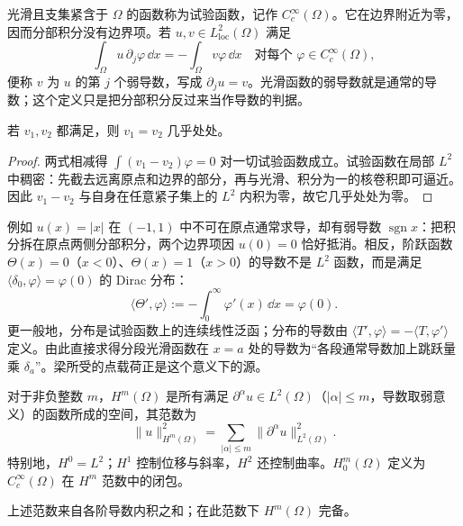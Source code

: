 光滑且支集紧含于 \(\Omega\) 的函数称为试验函数，记作
\(C_c^\infty(\Omega)\)。它在边界附近为零，因而分部积分没有边界项。若 \(u,v\in L^2_{\mathrm{loc}}(\Omega)\) 满足
\begin{equation}
 \int_\Omega u\,\partial_j\varphi\,\dd x
 =-\int_\Omega v\varphi\,\dd x
 \quad\text{对每个 }\varphi\in C_c^\infty(\Omega),
 \label{eq:advanced-weak-derivative}
\end{equation}
便称 \(v\) 为 \(u\) 的第 \(j\) 个弱导数，写成 \(\partial_j u=v\)。光滑函数的弱导数就是通常的导数；这个定义只是把分部积分反过来当作导数的判据。

\begin{proposition}[弱导数的唯一性]
若 \(v_1,v_2\) 都满足，则 \(v_1=v_2\) 几乎处处。
\end{proposition}

\begin{proof}
两式相减得 \(\int(v_1-v_2)\varphi=0\) 对一切试验函数成立。试验函数在局部 \(L^2\) 中稠密：先截去远离原点和边界的部分，再与光滑、积分为一的核卷积即可逼近。因此 \(v_1-v_2\) 与自身在任意紧子集上的 \(L^2\) 内积为零，故它几乎处处为零。
\end{proof}

例如 \(u(x)=|x|\) 在 \((-1,1)\) 中不可在原点通常求导，却有弱导数 \(\operatorname{sgn}x\)：把积分拆在原点两侧分部积分，两个边界项因 \(u(0)=0\) 恰好抵消。相反，阶跃函数
\(\Theta(x)=0\)（\(x<0\)）、\(\Theta(x)=1\)（\(x>0\)）的导数不是 \(L^2\) 函数，而是满足
\(\langle\delta_0,\varphi\rangle=\varphi(0)\) 的 Dirac 分布：
\[
 \langle\Theta',\varphi\rangle
 :=-\int_0^\infty\varphi'(x)\,\dd x=\varphi(0).
\]
更一般地，分布是试验函数上的连续线性泛函；分布的导数由
\(\langle T',\varphi\rangle=-\langle T,\varphi'\rangle\) 定义。由此直接求得分段光滑函数在 \(x=a\) 处的导数为“各段通常导数加上跳跃量乘 \(\delta_a\)”。梁所受的点载荷正是这个意义下的源。

\begin{definition}[Sobolev 空间]
对于非负整数 \(m\)，\(H^m(\Omega)\) 是所有满足
\(\partial^\alpha u\in L^2(\Omega)\)（\(|\alpha|\le m\)，导数取弱意义）的函数所成的空间，其范数为
\[
 \|u\|_{H^m(\Omega)}^2
 =\sum_{|\alpha|\le m}\|\partial^\alpha u\|_{L^2(\Omega)}^2.
\]
特别地，\(H^0=L^2\)；\(H^1\) 控制位移与斜率，\(H^2\) 还控制曲率。\(H_0^m(\Omega)\) 定义为 \(C_c^\infty(\Omega)\) 在 \(H^m\) 范数中的闭包。
\end{definition}

\begin{proposition}[\(H^m\) 是 Hilbert 空间]
上述范数来自各阶导数内积之和；在此范数下 \(H^m(\Omega)\) 完备。
\end{proposition}

